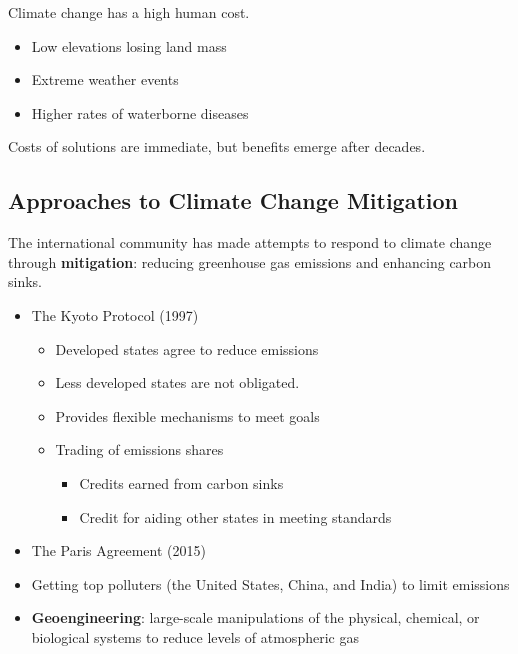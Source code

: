 \documentclass[
]{book}
\begin{document}
Climate change has a high human cost.

\begin{itemize}
\item
  Low elevations losing land mass
\item
  Extreme weather events
\item
  Higher rates of waterborne diseases
\end{itemize}

Costs of solutions are immediate, but benefits emerge after decades.

\hypertarget{approaches-to-climate-change-mitigation}{%
\subsection{Approaches to Climate Change Mitigation}\label{approaches-to-climate-change-mitigation}}

The international community has made attempts to respond to climate change through \textbf{mitigation}: reducing greenhouse gas emissions and enhancing carbon sinks.

\begin{itemize}
\item
  The Kyoto Protocol (1997)

  \begin{itemize}
  \item
    Developed states agree to reduce emissions
  \item
    Less developed states are not obligated.
  \item
    Provides flexible mechanisms to meet goals
  \item
    Trading of emissions shares

    \begin{itemize}
    \item
      Credits earned from carbon sinks
    \item
      Credit for aiding other states in meeting standards
    \end{itemize}
  \end{itemize}
\item
  The Paris Agreement (2015)
\item
  Getting top polluters (the United States, China, and India) to limit emissions
\item
  \textbf{Geoengineering}: large-scale manipulations of the physical, chemical, or biological systems to reduce levels of atmospheric gas
\end{itemize}
\end{document}
